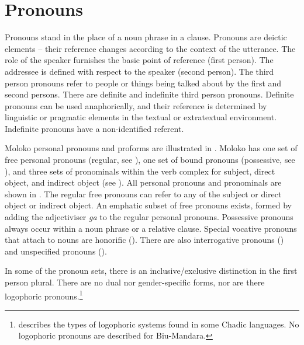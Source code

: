 \section{Pronouns}\label{sec:3.1}
\hypertarget{RefHeading1210821525720847}{}
Pronouns stand in the place of a noun phrase in a clause.  Pronouns are deictic elements -- their reference changes according to the context of the utterance.  The role of the speaker furnishes the basic point of reference (first person). The addressee is defined with respect to the speaker (second person).  The third person pronouns refer to people or things being talked about by the first and second persons. There are definite and indefinite third person pronouns. Definite pronouns can be used anaphorically, and their reference is determined by linguistic or pragmatic elements in the textual or extratextual environment. Indefinite pronouns have a non-identified referent.  

Moloko personal pronouns and proforms are illustrated in . Moloko has one set of free personal pronouns (regular, see ), one set of bound pronouns (possessive, see ), and three sets of pronominals within the verb complex for subject, direct object, and indirect object (see ). All personal pronouns and pronominals are shown in . The regular free pronouns can refer to any of the subject or direct object or indirect object. An emphatic subset of free pronouns exists, formed by adding the adjectiviser \textit{ga} to the regular personal pronouns. Possessive pronouns always occur within a noun phrase or a relative clause. Special vocative pronouns that attach to nouns are honorific ().  There are also interrogative pronouns () and unspecified pronouns (). 

\clearpage
In some of the pronoun sets, there is an inclusive/exclusive distinction in the first person plural. There are no dual nor gender-specific forms, nor are there logophoric pronouns.\footnote{\citet{Frajzyngier1985} describes the types of logophoric systems found in some Chadic languages. No logophoric pronouns are described for Biu-Mandara. }  

